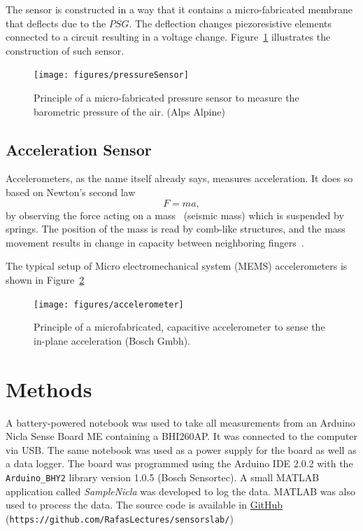 \documentclass[DIV=14]{scrartcl}
\begin{document}
    The sensor is constructed in a way that it contains a micro-fabricated membrane that deflects due to the $PSG$.
    The deflection changes piezoresistive elements connected to a circuit resulting in a voltage change.
    Figure~\ref{fig:barometer} illustrates the construction of such sensor.

    \begin{figure}[!h]
        \centering
        \texttt{[image: figures/pressureSensor]}
        \caption{Principle of a micro-fabricated pressure sensor to measure the barometric pressure
                 of the air. (Alps Alpine)}
        \label{fig:barometer}
    \end{figure}

    \subsection{Acceleration Sensor}
    Accelerometers, as the name itself already says, measures acceleration.
    It does so based on Newton's second law
    \begin{equation}
        F = ma
        \label{eq:newtonsLaw},
    \end{equation}
    by observing the force acting on a mass~\cite{labManual} (seismic mass) which is suspended by springs.
    The position of the mass is read by comb-like structures, and the mass movement results in change in capacity
    between neighboring fingers~\cite{labManual}.

    The typical setup of Micro electromechanical system (MEMS) accelerometers is shown in Figure~\ref{fig:accelerometer}
    \begin{figure}[h]
        \centering
        \texttt{[image: figures/accelerometer]}
        \caption{Principle of a microfabricated, capacitive accelerometer to sense the in-plane acceleration (Bosch Gmbh).}
        \label{fig:accelerometer}
    \end{figure}

    \clearpage


    \section{Methods}
    A battery-powered notebook was used to take all measurements from an Arduino Nicla Sense Board ME containing a BHI260AP.
    It was connected to the computer via USB.
    The same notebook was used as a power supply for the board as well as a data logger.
    The board was programmed using the Arduino IDE 2.0.2 with the \texttt{Arduino\_BHY2} library version 1.0.5 (Bosch Sensortec).
    A small MATLAB application called \textit{SampleNicla} was developed to log the data.
    MATLAB was also used to process the data.
    The source code is available in \href{https://github.com/RafasLectures/sensorslab/blob/main/SampleNicla.mlapp}{GitHub}
    (\texttt{https://github.com/RafasLectures/sensorslab/})
\end{document}
